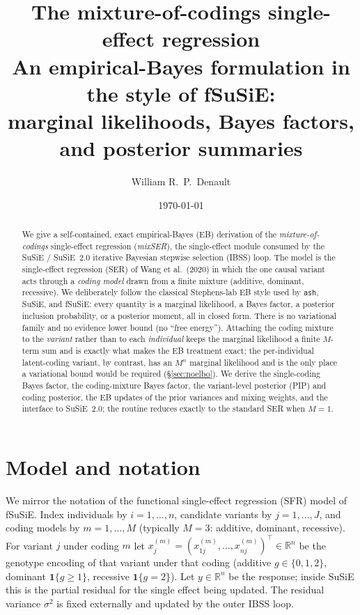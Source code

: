 \documentclass[11pt]{article}
\title{\textbf{The mixture-of-codings single-effect regression}\\[4pt]
\large An empirical-Bayes formulation in the style of fSuSiE:\\
marginal likelihoods, Bayes factors, and posterior summaries}
\author{William R.\ P.\ Denault}
\date{\today}
\newcommand{\R}{\mathbb{R}}
\newcommand{\sigsq}{\sigma^{2}}
\theoremstyle{plain}
\theoremstyle{remark}
\begin{document}
\maketitle

\begin{abstract}
We give a self-contained, exact empirical-Bayes (EB) derivation of the
\emph{mixture-of-codings} single-effect regression (\emph{mixSER}), the
single-effect module consumed by the SuSiE / SuSiE~2.0 iterative
Bayesian stepwise selection (IBSS) loop. The model is the single-effect
regression (SER) of Wang et al.\ (2020) in which the one causal variant acts
through a \emph{coding model} drawn from a finite mixture (additive, dominant,
recessive). We deliberately follow the classical Stephens-lab EB style used by
\texttt{ash}, SuSiE, and fSuSiE: every quantity is a marginal likelihood, a
Bayes factor, a posterior inclusion probability, or a posterior moment, all in
closed form. There is no variational family and no evidence lower bound (no
``free energy''). Attaching the coding mixture to the \emph{variant} rather than
to each \emph{individual} keeps the marginal likelihood a finite $M$-term sum
and is exactly what makes the EB treatment exact; the per-individual
latent-coding variant, by contrast, has an $M^{n}$ marginal likelihood and is
the only place a variational bound would be required (\S\ref{sec:noelbo}). We
derive the single-coding Bayes factor, the coding-mixture Bayes factor, the
variant-level posterior (PIP) and coding posterior, the EB updates of the prior
variances and mixing weights, and the interface to SuSiE~2.0; the routine
reduces exactly to the standard SER when $M=1$.
\end{abstract}

\section{Model and notation}\label{sec:model}

We mirror the notation of the functional single-effect regression (SFR) model
of fSuSiE. Index individuals by $i=1,\dots,n$, candidate variants by
$j=1,\dots,J$, and coding models by $m=1,\dots,M$ (typically $M=3$: additive,
dominant, recessive). For variant $j$ under coding $m$ let
$x_j^{(m)}=(x_{1j}^{(m)},\dots,x_{nj}^{(m)})^{\!\top}\in\R^{n}$ be the genotype
encoding of that variant under that coding (additive $g\in\{0,1,2\}$, dominant
$\mathbf 1\{g\ge 1\}$, recessive $\mathbf 1\{g=2\}$). Let $y\in\R^{n}$ be the
response; inside SuSiE this is the partial residual for the single effect being
updated. The residual variance $\sigsq$ is fixed externally and updated by the
outer IBSS loop.
\end{document}
